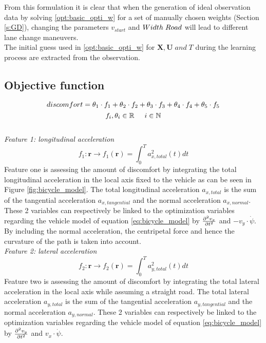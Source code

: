 From this formulation it is clear that when the generation of ideal observation data by solving \ref{opt:basic_opti_w} for a set of manually chosen weights (Section \ref{s:GD}), changing the parameters $v_{start}$ and $Width \hspace{1mm}Road$ will lead to different lane change maneuvers.\\ The initial guess used in \ref{opt:basic_opti_w} for $\bm{X}, \bm{U} \;and\; T$ during the learning process are extracted from the observation. 
\subsection{Objective function}\label{s:obj}

\begin{equation}\label{eq:obj}
discomfort = \theta_1 \cdot f_1 +\theta_2 \cdot f_2 +\theta_3 \cdot f_3 +\theta_4 \cdot f_4 +\theta_5 \cdot f_5 \\
\end{equation}
\[	f_i, \theta_i \in \mathbb{R} \hspace{5mm}
i \in \mathbb{N}\]\\


\textit{Feature 1: longitudinal acceleration}
\begin{equation}\label{eq:flong_acc}
f_{1}:\bm{r}\xrightarrow{}f_1(\bm{r})=\int_{0}^{T}a_{x,total}^{2}(t) dt
\end{equation}
Feature one is assessing the amount of discomfort by integrating the total longitudinal acceleration in the local axis fixed to the vehicle as can be seen in Figure \ref{fig:bicycle_model}. The total longitudinal acceleration  $a_{x,total} $ is the sum of the tangential acceleration $ a_{x,tangential}$ and the normal acceleration $a_{x,normal}$. These 2 variables can respectively be linked to the optimization variables regarding the vehicle model of equation \ref{eq:bicycle_model} by $\pdv[2]{v_x}{t}$ and $-v_y\cdot\dot{\psi}$. By including the normal acceleration, the centripetal force and hence the curvature of the path is taken into account. \\ 

\textit{Feature 2: lateral acceleration}
\begin{equation}\label{eq:flat_acc}
f_{2}:\bm{r}\xrightarrow{}f_2(\bm{r})=\int_{0}^{T}a_{y,total}^{2}(t) dt
\end{equation}
Feature two is assessing the amount of discomfort by integrating the total lateral acceleration in the local axis while assuming a straight road. The total lateral acceleration  $a_{y,total} $ is the sum of the tangential acceleration $ a_{y,tangential}$ and the normal acceleration $a_{y,normal}$. These 2 variables can respectively be linked to the optimization variables regarding the vehicle model of equation \ref{eq:bicycle_model} by $\pdv[2]{v_y}{t}$ and $v_x\cdot\dot{\psi}$.\\

